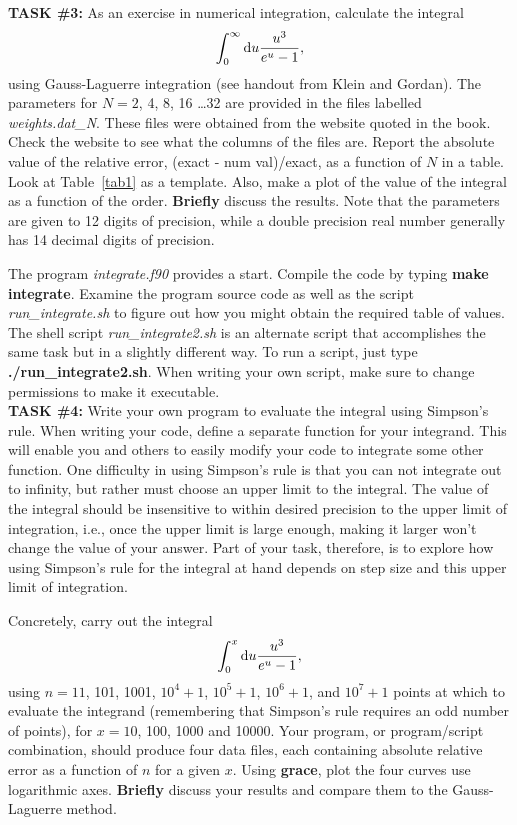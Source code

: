 \documentclass{article}
\begin{document}
{\bf TASK \#3:}
As an exercise in numerical integration, calculate the integral
$$
\int_0^\infty {\rm d}u \frac{u^3}{e^u -1},
$$
using Gauss-Laguerre integration (see handout from Klein and Gordan).
The parameters for $N=2$, 4, 8, 16 \dots 32 are provided in the
files labelled {\it weights.dat\_N}.  These files were obtained from the website quoted in the book.
Check the website to see what the columns of the files are.
Report the absolute value of the relative error, 
(exact - num val)/exact,
as a function of $N$ in a table.  Look at Table~\ref{tab1} as a template.  
Also, make a plot of the value of the integral as a function of the order.  {\bf Briefly} discuss the results.  
Note that the parameters are given to 12 digits of precision, while a double precision real 
number generally has 14 decimal digits of precision.

The program {\it integrate.f90} provides a start. 
Compile the code by typing 
{\bf make integrate}.
Examine the program source
code as well as the script {\it run\_integrate.sh} to figure out how you might obtain 
the required table of values.  The shell script {\it run\_integrate2.sh} is an alternate 
script that accomplishes the same task but in a slightly different way.  To run a script, just type
{\bf ./run\_integrate2.sh}.  When writing your own script, make sure to change permissions to 
make it executable.
\\

{\bf TASK \#4:}
Write your own program to evaluate the integral using Simpson's rule.  
When writing your code, define a separate function for your integrand.  This will enable you and others to 
easily modify your code to integrate some other function.
One difficulty in using Simpson's rule is that you can not
integrate out to infinity, but rather must choose an
upper limit to the integral.  The value of the integral should be insensitive to
within desired precision to the upper limit of integration, i.e., once the upper limit is large enough,
making it larger won't change the value of your answer.  Part of your task, therefore, is to explore
how using Simpson's rule for the integral at hand depends on step size and this upper limit of integration.

Concretely, carry out the integral 
$$
\int_0^x  {\rm d}u \frac{u^3}{e^u -1},
$$
using $n=11$, 101, 1001, $10^4+1$, $10^5+1$, $10^6+1$, and $10^7+1$ points at which to evaluate the integrand 
(remembering that Simpson's rule requires an odd number of points), for $x=10$, 100, 1000 and 10000.
Your program, or program/script combination, should produce four data files, each containing absolute relative error as a function of
$n$ for a given $x$.  Using {\bf grace}, plot the four curves use logarithmic axes.
{\bf Briefly} discuss your results and compare them to 
the Gauss-Laguerre method.
\\ 
\end{document}
